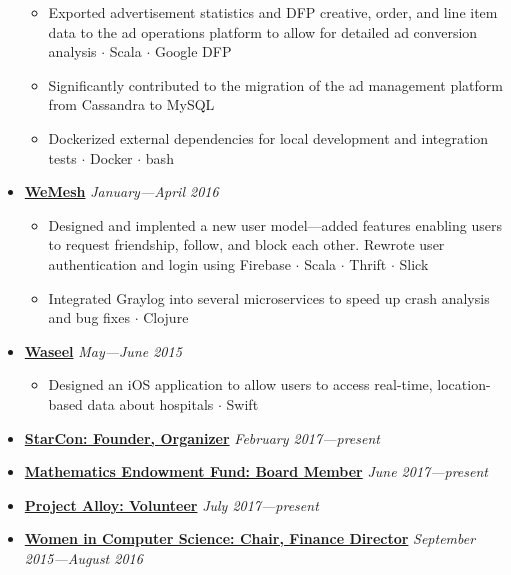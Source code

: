 \documentclass[5pt,letterpaper]{article}
\newcommand{\dt}{$\cdot$ }
\begin{document}
\begin{itemize}[leftmargin=1em, noitemsep]
    \begin{itemize}[label=\textbullet, noitemsep, nosep]
      \item Exported advertisement statistics and DFP creative, order, and line
        item data to the ad operations platform to allow for detailed ad
        conversion analysis \dt Scala \dt Google DFP
      \item Significantly contributed to the migration of the ad
        management platform from Cassandra to MySQL
      \item Dockerized external dependencies for local development and
        integration tests \dt Docker \dt bash
    \end{itemize}

  \item[]
    {\href{http://www.rave.io}{\textbf{WeMesh}} \hfill
    \emph{January---April 2016}}

    \begin{itemize}[label=\textbullet, noitemsep, nosep]
      \item Designed and implented a new user model---added features enabling
        users to request friendship, follow, and block each other. Rewrote user
        authentication and login using Firebase \dt Scala \dt Thrift \dt Slick
      \item Integrated Graylog into several microservices to speed up crash
        analysis and bug fixes \dt Clojure
    \end{itemize}

  \item[]
    {\href{https://www.waseel.com}{\textbf{Waseel}} \hfill
    \emph{May---June 2015}}

    \begin{itemize}[label=\textbullet, noitemsep]
      \item Designed an iOS application to allow users to access real-time,
        location-based data about hospitals \dt Swift
    \end{itemize}

  \item[]
    {\href{https://starcon.io}{\textbf{StarCon: Founder, Organizer}} \hfill
    \emph{February 2017---present}}

  \item[]
    {\href{https://uwaterloo.ca/math-endowment-fund/}{\textbf{Mathematics
    Endowment Fund: Board Member}} \hfill \emph{June 2017---present}}

  \item[]
    {\href{https://www.projectalloy.org/}{\textbf{Project Alloy: Volunteer}} \hfill
    \emph{July 2017---present}}

  \item[]
    {\href{http://wics.uwaterloo.ca}{\textbf{Women in Computer Science: Chair,
      Finance Director}} \hfill
    \emph{September 2015---August 2016}}

\end{itemize}
\end{document}
